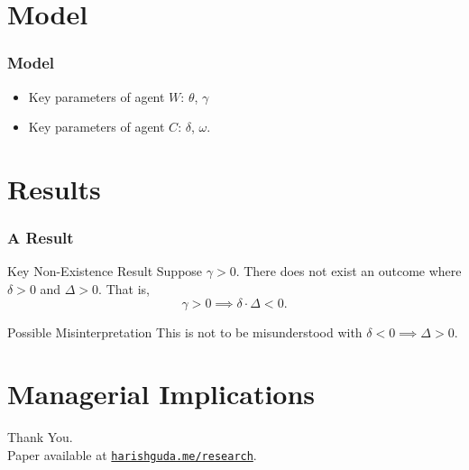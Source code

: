\documentclass[9pt, mathserif]{beamer}
\begin{document}
\section{Model}

\begin{frame}
\frametitle{Model}
\begin{itemize}[<+->]\setlength\itemsep{2em}
\item Key parameters of agent $W$: $\theta$, $\gamma$

\item Key parameters of agent $C$: $\delta$, $\omega$.

\end{itemize}


\end{frame}

\section{Results}

\begin{frame}
\frametitle{A Result}
\pause
\begin{block}{Key Non-Existence Result}
Suppose $\gamma > 0$. There does not exist an outcome where $\delta > 0$ and $\Delta > 0$. That is,
\begin{equation*}
\gamma > 0 \implies \delta \cdot \Delta < 0.
\end{equation*}
\end{block}
\pause
\begin{block}{Possible Misinterpretation}
This is not to be misunderstood with $\delta < 0 \implies \Delta > 0$.
\end{block}

\end{frame}

\section[Implications]{Managerial Implications}

\begin{frame}
\begin{center}
\textcolor{asumaroon}{\Huge{Thank You}.}\\ \bigskip
Paper available at \texttt{\href{https://harishguda.me/research}{harishguda.me/research}}.
\end{center}
\end{frame}
\end{document}
